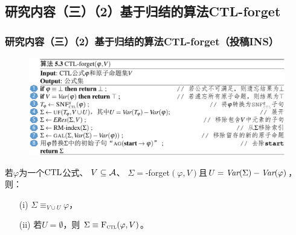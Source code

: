 \documentclass[aspectratio=1610, 9pt, CJK]{beamer}
\begin{document}
 

\subsection{研究内容（三）（2）基于归结的算法CTL-forget}
 

\begin{frame}
	\frametitle{研究内容（三）（2）基于归结的算法CTL-forget（投稿INS）}
	
	 
			
		\begin{figure}
			\includegraphics[scale=0.4]{figures/CTL-forget11}
		\end{figure}
			\begin{theorem}[可靠性]%
				若$\varphi$为一个$\textrm{CTL}$公式、 $V\subseteq\cal A$、 $\Sigma=$\CTL-forget$(\varphi,V)$且$U=\textit{Var}(\Sigma)-\textit{Var}(\varphi)$，则：
				\begin{itemize}
					\item[(i)] $\Sigma\equiv_{V\cup U}\varphi$，
					\item[(ii)] 若$U=\emptyset$，则 $\Sigma\equiv{\textsc{F}_{\textsc{ctl}}}(\varphi,V)$。
				\end{itemize}
			\end{theorem}
			
\end{frame}
\end{document}
